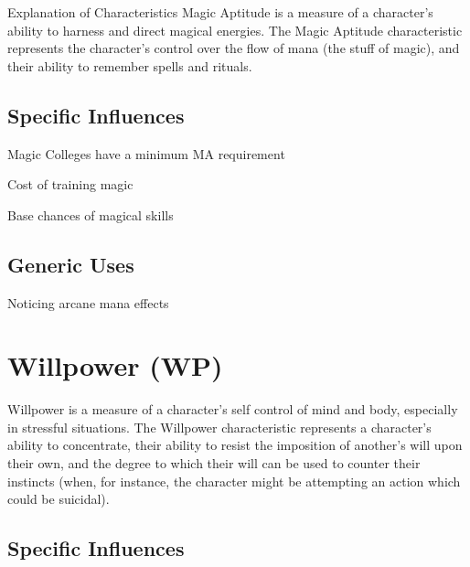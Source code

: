 \begin{Chapter}{Explanation of Characteristics}
Magic Aptitude is a measure of a character’s ability to harness and
direct magical energies.  The Magic Aptitude characteristic represents
the character’s control over the flow of mana (the stuff of magic),
and their ability to remember spells and rituals.

\subsection{Specific Influences}

\begin{Itemize}

\item Magic Colleges have a minimum MA requirement

\item Cost of training magic  

\item Base chances of magical skills 

\end{Itemize}

\subsection{Generic Uses}

\begin{Itemize}

\item Noticing arcane mana effects 

\end{Itemize}


\section{Willpower (WP)}

Willpower is a measure of a character’s self control of mind and body,
especially in stressful situations.  The Willpower characteristic
represents a character’s ability to concentrate, their ability to
resist the imposition of another’s will upon their own, and the degree
to which their will can be used to counter their instincts (when, for
instance, the character might be attempting an action which could be
suicidal).

\subsection{Specific Influences}

\begin{Itemize}


\end{Itemize}
\end{Chapter}
